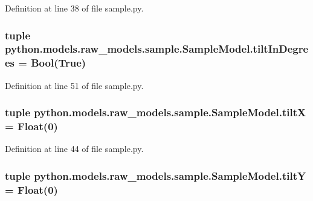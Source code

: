 Definition at line 38 of file sample.\-py.

\hypertarget{classpython_1_1models_1_1raw__models_1_1sample_1_1_sample_model_a27845e655075ba85439b6436f465bb3f}{
\subsubsection[{tilt\-In\-Degrees}]{\setlength{\rightskip}{0pt plus 5cm}tuple python.\-models.\-raw\-\_\-models.\-sample.\-Sample\-Model.\-tilt\-In\-Degrees = Bool(True)\hspace{0.3cm}{\ttfamily [static]}}}\label{classpython_1_1models_1_1raw__models_1_1sample_1_1_sample_model_a27845e655075ba85439b6436f465bb3f}


Definition at line 51 of file sample.\-py.

\hypertarget{classpython_1_1models_1_1raw__models_1_1sample_1_1_sample_model_aa7d73bd60a03f3c8f102c8c27d5e0c2d}{
\subsubsection[{tilt\-X}]{\setlength{\rightskip}{0pt plus 5cm}tuple python.\-models.\-raw\-\_\-models.\-sample.\-Sample\-Model.\-tilt\-X = Float(0)\hspace{0.3cm}{\ttfamily [static]}}}\label{classpython_1_1models_1_1raw__models_1_1sample_1_1_sample_model_aa7d73bd60a03f3c8f102c8c27d5e0c2d}


Definition at line 44 of file sample.\-py.

\hypertarget{classpython_1_1models_1_1raw__models_1_1sample_1_1_sample_model_af435d19b6d10ade9fbdf46b8b436b68c}{
\subsubsection[{tilt\-Y}]{\setlength{\rightskip}{0pt plus 5cm}tuple python.\-models.\-raw\-\_\-models.\-sample.\-Sample\-Model.\-tilt\-Y = Float(0)\hspace{0.3cm}{\ttfamily [static]}}}\label{classpython_1_1models_1_1raw__models_1_1sample_1_1_sample_model_af435d19b6d10ade9fbdf46b8b436b68c}


